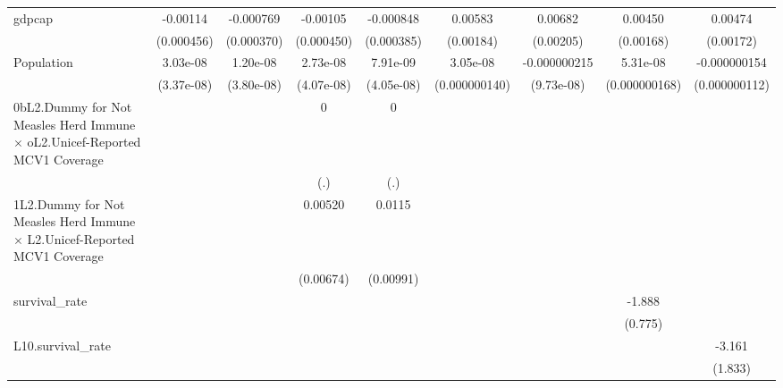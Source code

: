 \begin{table}[htbp]
\begin{tabular}{l*{8}{c}}
\addlinespace
gdpcap          & -0.00114\sym{*}  &-0.000769\sym{*}  & -0.00105\sym{*}  &-0.000848\sym{*}  &  0.00583\sym{**} &  0.00682\sym{**} &  0.00450\sym{**} &  0.00474\sym{**} \\
                &(0.000456)         &(0.000370)         &(0.000450)         &(0.000385)         &(0.00184)         &(0.00205)         &(0.00168)         &(0.00172)         \\
\addlinespace
Population      & 3.03e-08         & 1.20e-08         & 2.73e-08         & 7.91e-09         & 3.05e-08         &-0.000000215\sym{*}  & 5.31e-08         &-0.000000154         \\
                &(3.37e-08)         &(3.80e-08)         &(4.07e-08)         &(4.05e-08)         &(0.000000140)         &(9.73e-08)         &(0.000000168)         &(0.000000112)         \\
\addlinespace
0bL2.Dummy for Not Measles Herd Immune $\times$ oL2.Unicef-Reported MCV1 Coverage&                  &                  &        0         &        0         &                  &                  &                  &                  \\
                &                  &                  &      (.)         &      (.)         &                  &                  &                  &                  \\
\addlinespace
1L2.Dummy for Not Measles Herd Immune $\times$ L2.Unicef-Reported MCV1 Coverage&                  &                  &  0.00520         &   0.0115         &                  &                  &                  &                  \\
                &                  &                  &(0.00674)         &(0.00991)         &                  &                  &                  &                  \\
\addlinespace
survival\_rate   &                  &                  &                  &                  &                  &                  &   -1.888\sym{*}  &                  \\
                &                  &                  &                  &                  &                  &                  &  (0.775)         &                  \\
\addlinespace
L10.survival\_rate&                  &                  &                  &                  &                  &                  &                  &   -3.161         \\
                &                  &                  &                  &                  &                  &                  &                  &  (1.833)         \\

\end{tabular}
\end{table}

